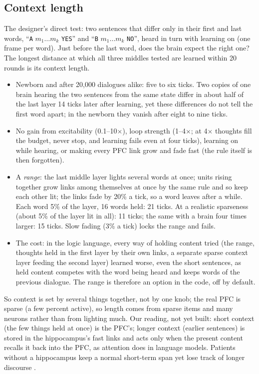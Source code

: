 \documentclass[11pt]{article}
\begin{document}
\subsection{Context length}\label{sec:context}
The designer's direct test: two sentences that differ only in their first and last words, ``\texttt{A} $m_1\dots m_k$
\texttt{YES}'' and ``\texttt{B} $m_1\dots m_k$ \texttt{NO}'', heard in turn with learning on (one frame per word). Just
before the last word, does the brain expect the right one? The longest distance at which all three middles tested are
learned within 20 rounds is its context length.
\begin{itemize}
\item Newborn and after 20,000 dialogues alike: five to six ticks. Two copies of one brain hearing the two sentences from
the same state differ in about half of the last layer 14 ticks later after learning, yet these differences do not tell
the first word apart; in the newborn they vanish after eight to nine ticks.
\item No gain from excitability (0.1--10$\times$), loop strength (1--4$\times$; at 4$\times$ thoughts fill the budget, never
stop, and learning fails even at four ticks), learning on while hearing, or making every PFC link grow and fade fast (the
rule itself is then forgotten).
\item A \emph{range}: the last middle layer lights several words at once; units rising together grow links among
themselves at once by the same rule and so keep each other lit; the links fade by 20\% a tick, so a word leaves after a
while. Each word 5\% of the layer, 16 words held: 21 ticks. At a realistic sparseness (about 5\% of the layer lit in all):
11 ticks; the same with a brain four times larger: 15 ticks. Slow fading (3\% a tick) locks the range and fails.
\item The cost: in the logic language, every way of holding content tried (the range, thoughts held in the first layer by
their own links, a separate sparse context layer feeding the second layer) learned worse, even the short sentences, as
held content competes with the word being heard and keeps words of the previous dialogue. The range is therefore an
option in the code, off by default.
\end{itemize}
So context is set by several things together, not by one knob; the real PFC is sparse (a few percent active), so length
comes from sparse items and many neurons rather than from lighting much. Our reading, not yet built: short context (the few
things held at once) is the PFC's; longer context (earlier sentences) is stored in the hippocampus's fast links and acts
only when the present content recalls it back into the PFC, as attention does in language models. Patients without a
hippocampus keep a normal short-term span yet lose track of longer discourse \cite{duff_2012,jeneson_2012}.
\end{document}
